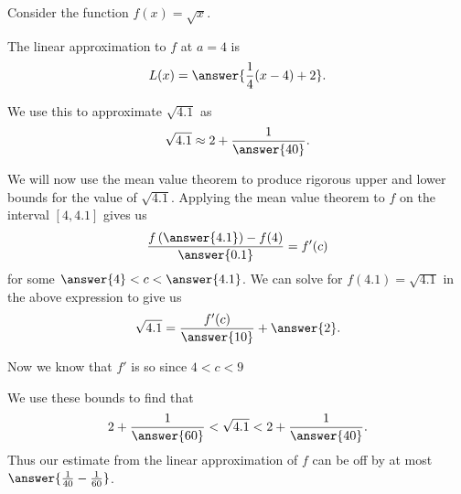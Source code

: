 \documentclass{ximera}
\author{Steven Gubkin}
\begin{document}
\begin{exercise}

Consider the function $f(x) = \sqrt{x}$.  

The linear approximation to $f$ at $a=4$ is
\[
L(x) = \answer{\frac{1}{4}(x-4) + 2}.
\]

We use this to approximate $\sqrt{4.1}$ as
\[
\sqrt{4.1} \approx 2 + \frac{1}{\answer{40}}.
\]

We will now use the mean value theorem to produce rigorous upper and lower bounds for the value of $\sqrt{4.1}$.  Applying the mean value theorem to $f$ on the interval $[4,4.1]$ gives us
\[
\frac{f\left(\answer{4.1}\right) - f(4)}{\answer{0.1}} = f'(c)
\]
for some $\answer{4}<c<\answer{4.1}$.  We can solve for $f(4.1) = \sqrt{4.1}$ in the above expression to give us
\[
\sqrt{4.1} = \frac{f'(c)}{\answer{10}} + \answer{2}.
\]

Now we know that $f'$ is  so since $4<c<9$
\begin{multipleChoice}
\end{multipleChoice}
We use these bounds to find that 
\[
2+\frac{1}{\answer{60}} < \sqrt{4.1} < 2+\frac{1}{\answer{40}}.
\]
Thus our estimate from the linear approximation of $f$ can be off by at most $\answer{\frac{1}{40}-\frac{1}{60}}$.

\end{exercise}
\end{document}
